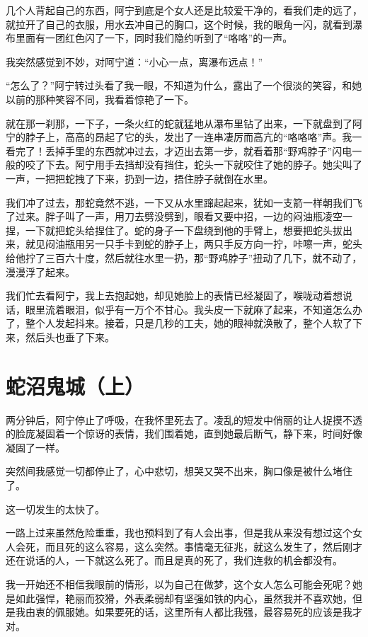 几个人背起自己的东西，阿宁到底是个女人还是比较爱干净的，看我们走的远了，就拉开了自己的衣服，用水去冲自己的胸口，这个时候，我的眼角一闪，就看到瀑布里面有一团红色闪了一下，同时我们隐约听到了“咯咯”的一声。

我突然感觉到不妙，对阿宁道：“小心一点，离瀑布远点！”

“怎么了？”阿宁转过头看了我一眼，不知道为什么，露出了一个很淡的笑容，和她以前的那种笑容不同，我看着惊艳了一下。

就在那一刹那，一下子，一条火红的蛇就猛地从瀑布里钻了出来，一下就盘到了阿宁的脖子上，高高的昂起了它的头，发出了一连串凄厉而高亢的“咯咯咯”声。我一看完了！丢掉手里的东西就冲过去，才迈出去第一步，就看着那“野鸡脖子”闪电一般的咬了下去。阿宁用手去挡却没有挡住，蛇头一下就咬住了她的脖子。她尖叫了一声，一把把蛇拽了下来，扔到一边，捂住脖子就倒在水里。

我们冲了过去，那蛇竟然不逃，一下又从水里蹿起起来，犹如一支箭一样朝我们飞了过来。胖子叫了一声，用刀去劈没劈到，眼看又要中招，一边的闷油瓶凌空一捏，一下就把蛇头给捏住了。蛇的身子一下盘绕到他的手臂上，想要把蛇头拔出来，就见闷油瓶用另一只手卡到蛇的脖子上，两只手反方向一拧，咔嚓一声，蛇头给他拧了三百六十度，然后就往水里一扔，那“野鸡脖子”扭动了几下，就不动了，漫漫浮了起来。

我们忙去看阿宁，我上去抱起她，却见她脸上的表情已经凝固了，喉咙动着想说话，眼里流着眼泪，似乎有一万个不甘心。我头皮一下就麻了起来，不知道怎么办了，整个人发起抖来。接着，只是几秒的工夫，她的眼神就涣散了，整个人软了下来，然后头也垂了下来。

\chapter{蛇沼鬼城（上）}

两分钟后，阿宁停止了呼吸，在我怀里死去了。凌乱的短发中俏丽的让人捉摸不透的脸庞凝固着一个惊讶的表情，我们围着她，直到她最后断气，静下来，时间好像凝固了一样。

突然间我感觉一切都停止了，心中悲切，想哭又哭不出来，胸口像是被什么堵住了。

这一切发生的太快了。

一路上过来虽然危险重重，我也预料到了有人会出事，但是我从来没有想过这个女人会死，而且死的这么容易，这么突然。事情毫无征兆，就这么发生了，然后刚才还在说话的人，一下就这么死了。而且是真的死了，我们连救的机会都没有。

我一开始还不相信我眼前的情形，以为自己在做梦，这个女人怎么可能会死呢？她是如此强悍，艳丽而狡猾，外表柔弱却有坚强如铁的内心，虽然我并不喜欢她，但是我由衷的佩服她。如果要死的话，这里所有人都比我强，最容易死的应该是我才对。

